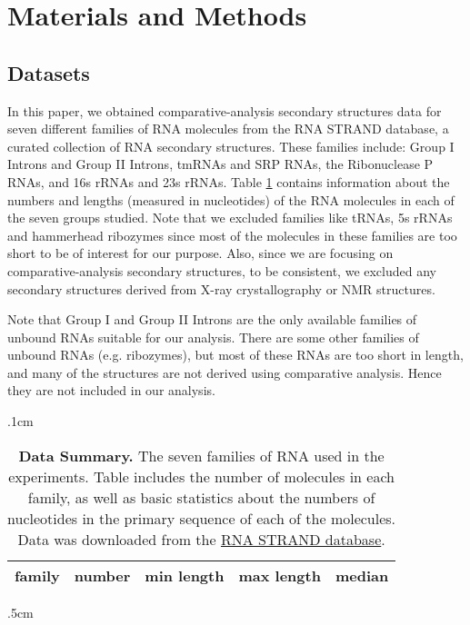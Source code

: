 \documentclass[10pt,letterpaper]{article}
\begin{document}
\section*{Materials and Methods}
\subsection*{Datasets}

In this paper, we obtained comparative-analysis secondary structures data for seven different families of RNA molecules from the RNA STRAND database\cite{Andronescu2008-rj}, a curated collection of RNA secondary structures. These families include: Group I Introns and Group II Introns\cite{Cannone2002-tp}, tmRNAs and SRP RNAs\cite{Andersen2006-uh}, the Ribonuclease P RNAs\cite{Brown1999-co}, and 16s rRNAs and 23s rRNAs\cite{Cannone2002-tp}. Table \ref{table:lengths} contains information about the numbers and lengths (measured in nucleotides) of the RNA molecules in each of the seven groups studied. Note that we excluded families like tRNAs, 5s rRNAs and hammerhead ribozymes since most of the molecules in these families are too short to be of interest for our purpose. Also, since we are focusing on comparative-analysis secondary structures, to be consistent, we excluded any secondary structures derived from X-ray crystallography or NMR structures.

Note that Group I and Group II Introns are the only available families of unbound RNAs suitable for our analysis. There are some other families of unbound RNAs (e.g. ribozymes), but most of these RNAs are too short in length, and many of the structures are not derived using comparative analysis. Hence they are not included in our analysis.

\vglue .1cm
\begin{table}[h!]
\begin{center}
\begin{tabular}{ l || r | r | r| r}
\hglue 5mm {\bf family} & {\bf number} & {\bf min length} & {\bf max length} & {\bf median} \\ \hline \hline

\end{tabular}
\vglue .5cm
\caption{\footnotesize {\bf Data Summary.} The seven families of RNA used in the experiments. Table includes the number of molecules in each family, as well as basic statistics about the numbers of nucleotides in the primary sequence of each of the molecules. Data was downloaded from the \href{http://www.rnasoft.ca/strand/}{RNA STRAND database}.}
\label{table:lengths}
\end{center}
\end{table}
\end{document}
